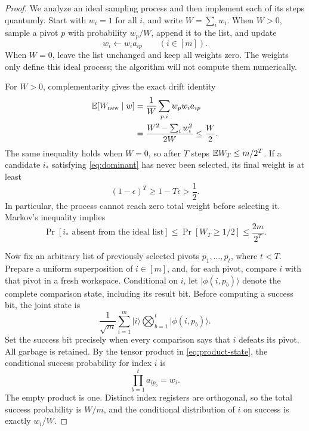 \begin{proof}
We analyze an ideal sampling process and then implement each of its
steps quantumly. Start with $w_i=1$ for all $i$, and write $W=\sum_iw_i$.
When $W>0$, sample a pivot $p$ with probability $w_p/W$, append it to
the list, and update
\begin{equation}\label{eq:weights}
 w_i\longleftarrow w_i a_{ip}\qquad(i\in[m]).
\end{equation}
When $W=0$, leave the list unchanged and keep all weights zero. The
weights only define this ideal process; the algorithm will not compute
them numerically.

For $W>0$, complementarity gives the exact drift identity
\begin{align}
 \mathbb E[W_{\mathrm{new}}\mid w]
 &=\frac{1}{W}\sum_{p,i}w_pw_i a_{ip}\notag\\
 &=\frac{W^2-\sum_iw_i^2}{2W}\le\frac W2.
 \label{eq:drift}
\end{align}
The same inequality holds when $W=0$, so after $T$ steps
$\mathbb E W_T\le m/2^T$. If a candidate $i_\ast$ satisfying
\eqref{eq:dominant} has never been selected, its final weight is at
least
\[
 (1-\epsilon)^T\ge1-T\epsilon>\frac12.
\]
In particular, the process cannot reach zero total weight before
selecting it. Markov's inequality implies
\begin{equation}\label{eq:ideal-miss}
 \Pr[i_\ast\text{ absent from the ideal list}]
 \le\Pr[W_T\ge1/2]\le\frac{2m}{2^T}.
\end{equation}

Now fix an arbitrary list of previously selected pivots
$p_1,\ldots,p_t$, where $t<T$. Prepare a uniform superposition of
$i\in[m]$, and, for each pivot, compare $i$ with that pivot in a fresh
workspace. Conditional on $i$, let $\lvert\phi(i,p_b)\rangle$ denote
the complete comparison state, including its result bit. Before
computing a success bit, the joint state is
\begin{equation}\label{eq:product-state}
 \frac1{\sqrt m}\sum_{i=1}^m
  \lvert i\rangle\bigotimes_{b=1}^t
  \lvert\phi(i,p_b)\rangle.
\end{equation}
Set the success bit precisely when every comparison says that $i$
defeats its pivot. All garbage is retained. By the tensor product in
\eqref{eq:product-state}, the conditional success probability for index
$i$ is
\[
 \prod_{b=1}^t a_{i p_b}=w_i.
\]
The empty product is one. Distinct index registers are orthogonal,
so the total success probability is $W/m$, and the conditional
distribution of $i$ on success is exactly $w_i/W$.


\end{proof}
